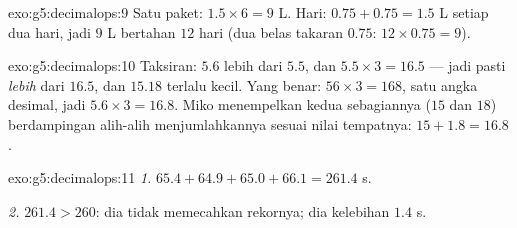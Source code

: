 \begin{solution}{exo:g5:decimalops:9}
Satu paket: $1.5 \times 6 = 9$ L. Hari: $0.75 + 0.75 = 1.5$ L setiap
dua hari, jadi $9$ L bertahan $12$ hari (dua belas takaran $0.75$:
$12 \times 0.75 = 9$).
\end{solution}

\begin{solution}{exo:g5:decimalops:10}
Taksiran: $5.6$ lebih dari $5.5$, dan $5.5 \times 3 = 16.5$ --- jadi
 pasti \emph{lebih} dari $16.5$, dan $15.18$ terlalu
kecil. Yang benar: $56 \times 3 = 168$, satu angka desimal, jadi
$5.6 \times 3 = 16.8$. Miko menempelkan kedua  sebagiannya
($15$ dan $18$) berdampingan alih-alih menjumlahkannya sesuai nilai
tempatnya: $15 + 1.8 = 16.8$.
\end{solution}

\begin{solution}{exo:g5:decimalops:11}
\emph{1.} $65.4 + 64.9 + 65.0 + 66.1 = 261.4$ s.

\emph{2.} $261.4 > 260$: dia tidak memecahkan rekornya; dia
kelebihan $1.4$ s.

\end{solution}
